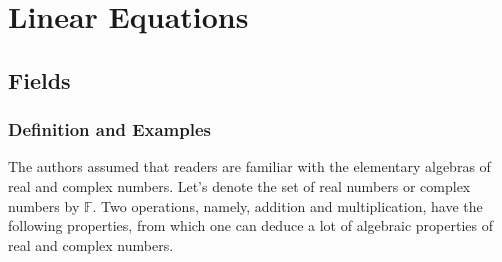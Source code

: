 \chapter{Linear Equations}

\section{Fields}

\subsection{Definition and Examples}

The authors assumed that readers are familiar with the elementary algebras of real and complex numbers. Let's denote the set of real numbers or complex numbers by $\mathbb{F}$. Two operations, namely, addition and multiplication, have the following properties, from which one can deduce a lot of algebraic properties of real and complex numbers.

